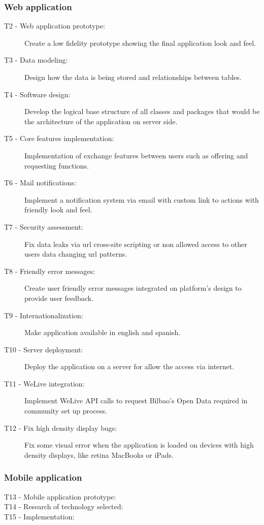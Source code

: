 \documentclass{DeustoFDP}
\begin{document}
\subsubsection{Web application}
\begin{description}
	\item[T2 - Web application prototype:] Create a low fidelity prototype showing the final application look and feel.
	\item[T3 - Data modeling:] Design how the data is being stored and relationships between tables. 
	\item[T4 - Software design:] Develop the logical base structure of all classes and packages that would be the architecture of the application on server side.
	\item[T5 - Core features implementation:] Implementation of exchange features between users such as offering and requesting functions.
	\item[T6 - Mail notifications:] Implement a notification system via email with custom link to actions with friendly look and feel.
	\item[T7 - Security assessment:] Fix data leaks via url cross-site scripting or non allowed access to other users data changing url patterns.
	\item[T8 - Friendly error messages:] Create user friendly error messages integrated on platform's design to provide user feedback.
	\item[T9 - Internationalization:] Make application available in english and spanish.
	\item[T10 - Server deployment:] Deploy the application on a server for allow the access via internet.
	\item[T11 - WeLive integration:] Implement WeLive API calls to request Bilbao's Open Data required in community set up process.
	\item[T12 - Fix high density display bugs:] Fix some visual error when the application is loaded on devices with high density displays, like retina MacBooks or iPads.
\end{description}

\subsubsection{Mobile application}
\begin{description}
	\item[T13 - Mobile application prototype:]
	\item[T14 - Research of technology selected:] 
	\item[T15 - Implementation:] 
\end{description}
\end{document}
